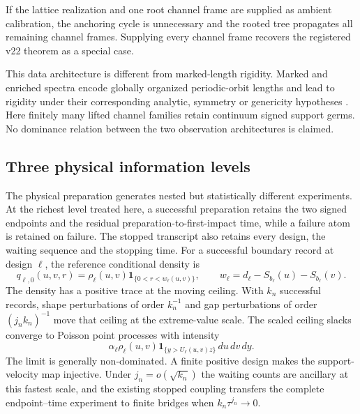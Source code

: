 If the lattice realization and one root channel frame are supplied as ambient
calibration, the anchoring cycle is unnecessary and the rooted tree propagates
all remaining channel frames.  Supplying every channel frame recovers the
registered v22 theorem as a special case.

This data architecture is different from marked-length rigidity.  Marked and
enriched spectra encode globally organized periodic-orbit lengths and lead to
rigidity under their corresponding analytic, symmetry or genericity
hypotheses \cite{BDKL,DSKL,Osterman,FinamoreLeguil}.  Here finitely many
lifted channel families retain continuum signed support germs.  No dominance
relation between the two observation architectures is claimed.

\subsection{Three physical information levels}

The physical preparation generates nested but statistically different
experiments.  At the richest level treated here, a successful preparation
retains the two signed endpoints and the residual preparation-to-first-impact
time, while a failure atom is retained on failure.  The stopped transcript
also retains every design, the waiting sequence and the stopping time.  For a
successful boundary record at design \(\ell\), the reference conditional
density is
\begin{equation}\label{eq:intro-v23-et-density}
 q_{\ell,0}(u,v,r)=
 \rho_\ell(u,v)\mathbf1_{\{0<r<w_\ell(u,v)\}},
 \qquad
 w_\ell=d_\ell-S_{b_\ell}(u)-S_{b_\ell}(v).
\end{equation}
The density has a positive trace at the moving ceiling.  With \(k_n\)
successful records, shape perturbations of order \(k_n^{-1}\) and gap
perturbations of order \((j_nk_n)^{-1}\) move that ceiling at the extreme-value
scale.  The scaled ceiling slacks converge to Poisson point processes with
intensity
\begin{equation}\label{eq:intro-v23-poisson-intensity}
 \alpha_\ell\rho_\ell(u,v)
 \mathbf1_{\{y>U_\ell(u,v)z\}}\,du\,dv\,dy.
\end{equation}
The limit is generally non-dominated.  A finite positive design makes the
support-velocity map injective.  Under \(j_n=o(\sqrt{k_n})\) the waiting counts
are ancillary at this fastest scale, and the existing stopped coupling
transfers the complete endpoint--time experiment to finite bridges when
\(k_n\tau^{j_n}\to0\).

